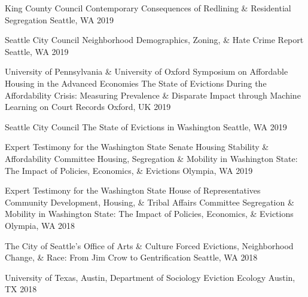 \begin{cventries}
  \cventry
    {King County Council} %
    {Contemporary Consequences of Redlining \& Residential Segregation} %
    {Seattle, WA} %
    {2019} %
    {}

  \cventry
    {Seattle City Council} %
    {Neighborhood Demographics, Zoning, \& Hate Crime Report} %
    {Seattle, WA} %
    {2019} %
    {}

  \cventry
    {University of Pennsylvania \& University of Oxford Symposium on Affordable Housing in the Advanced Economies} %
    {The State of Evictions During the Affordability Crisis: Measuring Prevalence \& Disparate Impact through Machine Learning on Court Records} %
    {Oxford, UK} %
    {2019} %
    {}

  \cventry
    {Seattle City Council} %
    {The State of Evictions in Washington} %
    {Seattle, WA} %
    {2019} %
    {}

  \cventry
    {Expert Testimony for the Washington State Senate Housing Stability \& Affordability Committee} %
    {Housing, Segregation \& Mobility in Washington State: The Impact of Policies, Economics, \& Evictions} %
    {Olympia, WA} %
    {2019} %
    {}

  \cventry
    {Expert Testimony for the Washington State House of Representatives Community Development, Housing, \& Tribal Affairs Committee} %
    {Segregation \& Mobility in Washington State: The Impact of Policies, Economics, \& Evictions} %
    {Olympia, WA} %
    {2018} %
    {}

  \cventry
    {The City of Seattle’s Office of Arts \& Culture} %
    {Forced Evictions, Neighborhood Change, \& Race: From Jim Crow to Gentrification} %
    {Seattle, WA} %
    {2018} %
    {}

  \cventry
    {University of Texas, Austin, Department of Sociology} %
    {Eviction Ecology} %
    {Austin, TX} %
    {2018} %
    {}


\end{cventries}
